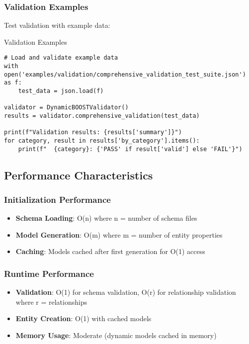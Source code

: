\subsubsection{Validation Examples}
\label{sec:python-validation-examples}

Test validation with example data:

\begin{pythonexample}{Validation Examples}
\begin{verbatim}
# Load and validate example data
with open('examples/validation/comprehensive_validation_test_suite.json') as f:
    test_data = json.load(f)

validator = DynamicBOOSTValidator()
results = validator.comprehensive_validation(test_data)

print(f"Validation results: {results['summary']}")
for category, result in results['by_category'].items():
    print(f"  {category}: {'PASS' if result['valid'] else 'FAIL'}")
\end{verbatim}
\end{pythonexample}

\subsection{Performance Characteristics}
\label{sec:python-performance}

\subsubsection{Initialization Performance}
\label{sec:python-init-performance}

\begin{itemize}
    \item \textbf{Schema Loading}: O(n) where n = number of schema files
    \item \textbf{Model Generation}: O(m) where m = number of entity properties  
    \item \textbf{Caching}: Models cached after first generation for O(1) access
\end{itemize}

\subsubsection{Runtime Performance}
\label{sec:python-runtime-performance}

\begin{itemize}
    \item \textbf{Validation}: O(1) for schema validation, O(r) for relationship validation where r = relationships
    \item \textbf{Entity Creation}: O(1) with cached models
    \item \textbf{Memory Usage}: Moderate (dynamic models cached in memory)
\end{itemize}

